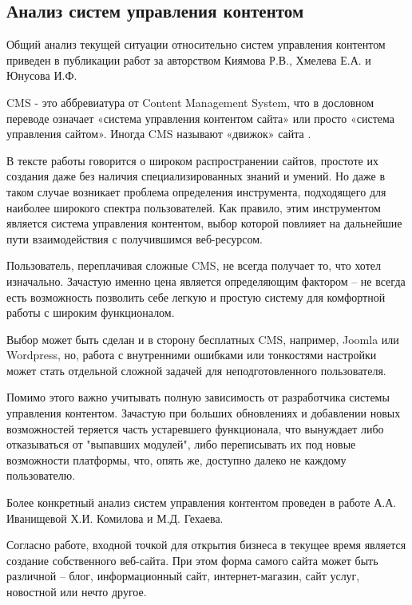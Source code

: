 \subsection{Анализ систем управления контентом}

Общий анализ текущей ситуации относительно систем управления контентом приведен в публикации работ \cite{kiyamov-cms} за авторством Киямова Р.В., Хмелева Е.А. и Юнусова И.Ф.

CMS - это аббревиатура от Content Management System, что в дословном переводе означает «система управления контентом сайта» или просто «система управления сайтом».
Иногда CMS называют «движок» сайта \cite{kiyamov-cms-1}.

В тексте работы говорится о широком распространении сайтов, простоте их создания даже без наличия специализированных знаний и умений.
Но даже в таком случае возникает проблема определения инструмента, подходящего для наиболее широкого спектра пользователей.
Как правило, этим инструментом является система управления контентом, выбор которой повлияет на дальнейшие пути взаимодействия с получившимся веб-ресурсом.

Пользователь, переплачивая сложные CMS, не всегда получает то, что хотел изначально.
Зачастую именно цена является определяющим фактором -- не всегда есть возможность позволить себе легкую и простую систему для комфортной работы с широким функционалом.

Выбор может быть сделан и в сторону бесплатных CMS, например, Joomla или Wordpress, но, работа с внутренними ошибками или тонкостями настройки может стать отдельной сложной задачей для неподготовленного пользователя.

Помимо этого важно учитывать полную зависимость от разработчика системы управления контентом.
Зачастую при больших обновлениях и добавлении новых возможностей теряется часть устаревшего функционала, что вынуждает либо отказываться от "выпавших модулей", либо переписывать их под новые возможности платформы, что, опять же, доступно далеко не каждому пользователю.

Более конкретный анализ систем управления контентом проведен в работе \cite{ivanisheva-cms} А.А. Иванищевой Х.И. Комилова и М.Д. Гехаева.

Согласно работе, входной точкой для открытия бизнеса в текущее время является создание собственного веб-сайта.
При этом форма самого сайта может быть различной -- блог, информационный сайт, интернет-магазин, сайт услуг, новостной или нечто другое.

